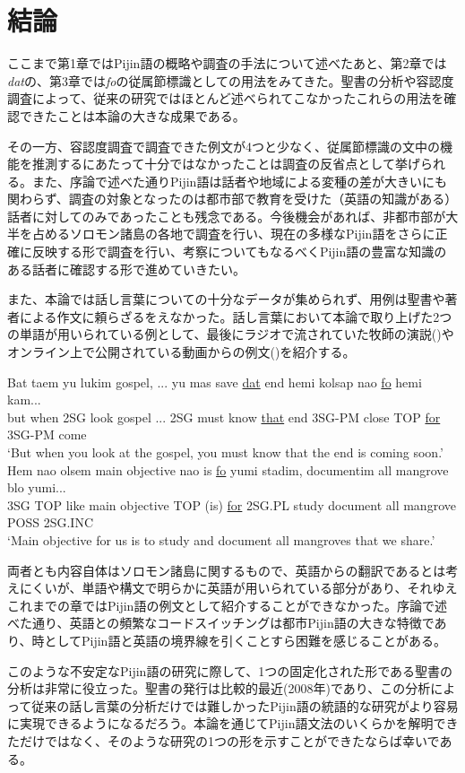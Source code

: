 \chapter{結論}\label{sec:conclusion}
ここまで第1章ではPijin語の概略や調査の手法について述べたあと、第2章では\textit{dat}の、第3章では\textit{fo}の従属節標識としての用法をみてきた。聖書の分析や容認度調査によって、従来の研究ではほとんど述べられてこなかったこれらの用法を確認できたことは本論の大きな成果である。

その一方、容認度調査で調査できた例文が4つと少なく、従属節標識の文中の機能を推測するにあたって十分ではなかったことは調査の反省点として挙げられる。また、序論で述べた通りPijin語は話者や地域による変種の差が大きいにも関わらず、調査の対象となったのは都市部で教育を受けた（英語の知識がある）話者に対してのみであったことも残念である。今後機会があれば、非都市部が大半を占めるソロモン諸島の各地で調査を行い、現在の多様なPijin語をさらに正確に反映する形で調査を行い、考察についてもなるべくPijin語の豊富な知識のある話者に確認する形で進めていきたい。

また、本論では話し言葉についての十分なデータが集められず、用例は聖書や著者による作文に頼らざるをえなかった。話し言葉において本論で取り上げた2つの単語が用いられている例として、最後にラジオで流されていた牧師の演説()やオンライン上で公開されている動画からの例文()を紹介する。

\begin{exe}
\ex\label{bokushi}
\gll Bat taem yu lukim gospel, ... yu mas save \underline{dat} end hemi kolsap nao \underline{fo} hemi kam...\\
but when 2SG look gospel ... 2SG must know \underline{that} end 3SG-PM close TOP \underline{for} 3SG-PM come\\
\glt `But when you look at the gospel, you must know that the end is coming soon.'
\ex\label{manguru1}
\gll Hem nao olsem main objective nao is \underline{fo} yumi stadim, documentim all mangrove blo yumi...\\
3SG TOP like main objective TOP (is) \underline{for} 2SG.PL study document all mangrove POSS 2SG.INC\\
\glt `Main objective for us is to study and document all mangroves that we share.'\citep[20分4秒]{manguru}
\end{exe}

両者とも内容自体はソロモン諸島に関するもので、英語からの翻訳であるとは考えにくいが、単語や構文で明らかに英語が用いられている部分があり、それゆえこれまでの章ではPijin語の例文として紹介することができなかった。序論で述べた通り、英語との頻繁なコードスイッチングは都市Pijin語の大きな特徴であり、時としてPijin語と英語の境界線を引くことすら困難を感じることがある。

このような不安定なPijin語の研究に際して、1つの固定化された形である聖書の分析は非常に役立った。聖書の発行は比較的最近(2008年)であり、この分析によって従来の話し言葉の分析だけでは難しかったPijin語の統語的な研究がより容易に実現できるようになるだろう。本論を通じてPijin語文法のいくらかを解明できただけではなく、そのような研究の1つの形を示すことができたならば幸いである。
